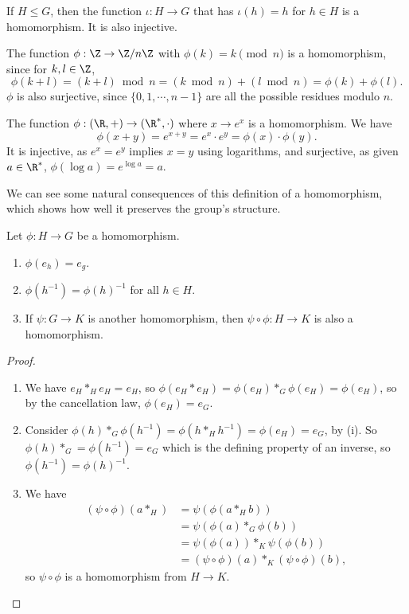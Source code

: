 \documentclass[a4]{scrreprt}
\begin{document}
\begin{example}
	If $H \leq G$, then the function $\iota : H \rightarrow G$ that has $\iota(h) = h$ for $h \in H$ is a homomorphism. It is also injective.
\end{example}

\begin{example}
	The function $\phi : \Z\rightarrow \Z/n\Z$ with $\phi(k) = k \pmod{n}$ is a homomorphism, since for $k, l \in \Z$,
	$$
\phi(k + l) = (k + l) \bmod{n} = (k \bmod{n}) + (l \bmod{n}) = \phi(k) + \phi(l).
	$$
	$\phi$ is also surjective, since $\{0, 1, \cdots, n - 1\}$ are all the possible residues modulo $n$.
\end{example}

\begin{example}
	The function $\phi : (\R, + )\rightarrow (\R^*, \cdot)$ where $x \rightarrow e^x$ is a homomorphism. We have
	$$
	\phi(x + y) = e^{x + y} = e^x \cdot e^y = \phi(x) \cdot \phi(y).
	$$
	It is injective, as $e^x = e^y$ implies $x = y$ using logarithms, and surjective, as given $a \in \R^*$, $\phi(\log a) = e^{\log a} = a$.
\end{example}

We can see some natural consequences of this definition of a homomorphism, which shows how well it preserves the group's structure.

\begin{proposition}
	Let $\phi : H \rightarrow G$ be a homomorphism.
	\begin{enumerate}[label=(\roman*)]
		\item $\phi(e_h) = e_g$. 
		\item $\phi(h^{-1}) = \phi(h)^{-1}$ for all $h \in H$.
		\item If $\psi : G \rightarrow K$ is another homomorphism, then $\psi \circ \phi : H \rightarrow K$ is also a homomorphism.
	\end{enumerate}
\end{proposition}
\begin{proof}
	$ $ \phantom{\qedhere}
	\begin{enumerate}[label=(\roman*)]
		\item We have $e_H *_H e_H = e_H$, so $\phi(e_H * e_H) = \phi(e_H) *_G \phi(e_H) = \phi(e_H)$, so by the cancellation law, $\phi(e_H) = e_G$.
		\item Consider $\phi(h) *_G \phi(h^{-1}) = \phi(h *_H h^{-1}) = \phi(e_H) = e_G$, by (i). So $\phi(h) *_G = \phi(h^{-1}) = e_G$ which is the defining property of an inverse, so $\phi(h^{-1}) = \phi(h)^{-1}$.
		\item We have 
		\begin{align*}
			(\psi \circ \phi)(a *_H) &= \psi(\phi(a *_H b))\\
									 &= \psi(\phi(a) *_G \phi(b))\\ 
									 &= \psi(\phi(a)) *_K \psi(\phi(b)) \\
									 &= (\psi \circ \phi)(a) *_K (\psi \circ \phi)(b),
		\end{align*}
		so $\psi \circ \phi$ is a homomorphism from $H \rightarrow K$.\hfill \qedsymbol
	\end{enumerate}
\end{proof}
\end{document}

